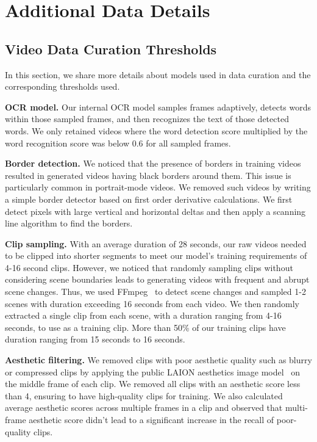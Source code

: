 \section{Additional Data Details}

\subsection{Video Data Curation Thresholds}  \label{appendix:data_curation_thresholds}
In this section, we share more details about models used in data curation and the corresponding thresholds used.

\textbf{OCR model.} Our internal OCR model samples frames adaptively, detects words within those sampled frames, and then recognizes the text of those detected words.
We only retained videos where the word detection score multiplied by the word recognition score was below 0.6 for all sampled frames.

\textbf{Border detection.} We noticed that the presence of borders in training videos resulted in generated videos having black borders around them. This issue is particularly common in portrait-mode videos. We removed such videos by writing a simple border detector based on first order derivative calculations. We first detect pixels with large vertical and horizontal deltas and then apply a scanning line algorithm to find the borders.

\textbf{Clip sampling.} With an average duration of 28 seconds, our raw videos needed to be clipped into shorter segments to meet our \OursVideo model's training requirements of 4-16 second clips. However, we noticed that randomly sampling clips without considering scene boundaries leads to generating videos with frequent and abrupt scene changes.
Thus, we used FFmpeg~\citep{ffmpeg} to detect scene changes and sampled 1-2 scenes with duration exceeding 16 seconds from each video. We then randomly extracted a single clip from each scene, with a duration ranging from 4-16 seconds, to use as a training clip.  More than 50\% of our training clips have duration ranging from 15 seconds to 16 seconds.

\textbf{Aesthetic filtering.} We removed clips with poor aesthetic quality such as blurry or compressed clips by applying the public LAION aesthetics image model~\citep{schuhmann2022laion} on the middle frame of each clip.
We removed all clips with an aesthetic score less than 4, ensuring to have high-quality clips for training. We also calculated average aesthetic scores across multiple frames in a clip and observed that multi-frame aesthetic score didn't lead to a significant increase in the recall of poor-quality clips.

